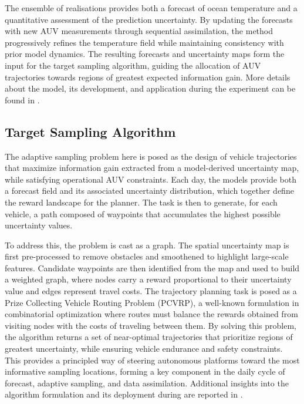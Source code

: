 The ensemble of realisations provides both a forecast of ocean
temperature and a quantitative assessment of the prediction
uncertainty.  By updating the forecasts with new AUV measurements
through sequential assimilation, the method progressively refines the
temperature field while maintaining consistency with prior model
dynamics. The resulting forecasts and uncertainty maps form the input
for the target sampling algorithm, guiding the allocation of AUV
trajectories towards regions of greatest expected information
gain. More details about the model, its development, and application
during the \proj experiment can be found in \cite{Duarte2025}.

\subsection{Target Sampling Algorithm}

The adaptive sampling problem here is posed as the design of vehicle
trajectories that maximize information gain
\cite{eidsvik2015,fossum18} extracted from a model-derived uncertainty
map, while satisfying operational AUV constraints. Each day, the
models provide both a forecast field and its associated uncertainty
distribution, which together define the reward landscape for the
planner. The task is then to generate, for each vehicle, a path
composed of waypoints that accumulates the highest possible
uncertainty values.

To address this, the problem is cast as a graph. The spatial
uncertainty map is first pre-processed to remove obstacles and
smoothened to highlight large-scale features. Candidate waypoints are
then identified from the map and used to build a weighted graph, where
nodes carry a reward proportional to their uncertainty value and edges
represent travel costs. The trajectory planning task is posed as a
Prize Collecting Vehicle Routing Problem
(PCVRP)\cite{vidal2013,toth2014vehicle}, a well-known formulation in
combinatorial optimization where routes must balance the rewards
obtained from visiting nodes with the costs of traveling between
them. By solving this problem, the algorithm returns a set of
near-optimal trajectories that prioritize regions of greatest
uncertainty, while ensuring vehicle endurance and safety
constraints. This provides a principled way of steering autonomous
platforms toward the most informative sampling locations, forming a
key component in the daily cycle of forecast, adaptive sampling, and
data assimilation. Additional insights into the algorithm formulation
and its deployment during \proj are reported in \cite{bernacchi2025}.

